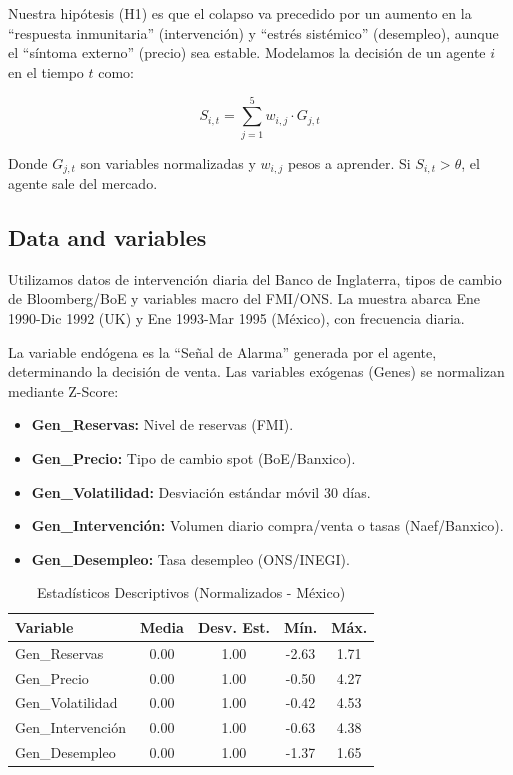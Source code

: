 Nuestra hipótesis (H1) es que el colapso va precedido por un aumento en la ``respuesta inmunitaria'' (intervención) y ``estrés sistémico'' (desempleo), aunque el ``síntoma externo'' (precio) sea estable. Modelamos la decisión de un agente $i$ en el tiempo $t$ como:

\begin{equation}
S_{i,t} = \sum_{j=1}^{5} w_{i,j} \cdot G_{j,t}
\end{equation}

Donde $G_{j,t}$ son variables normalizadas y $w_{i,j}$ pesos a aprender. Si $S_{i,t} > \theta$, el agente sale del mercado.

\subsection{Data and variables}

Utilizamos datos de intervención diaria del Banco de Inglaterra, tipos de cambio de Bloomberg/BoE y variables macro del FMI/ONS. La muestra abarca Ene 1990-Dic 1992 (UK) y Ene 1993-Mar 1995 (México), con frecuencia diaria.

La variable endógena es la ``Señal de Alarma'' generada por el agente, determinando la decisión de venta. Las variables exógenas (Genes) se normalizan mediante Z-Score:
\begin{itemize}
    \item \textbf{Gen\_Reservas:} Nivel de reservas (FMI).
    \item \textbf{Gen\_Precio:} Tipo de cambio spot (BoE/Banxico).
    \item \textbf{Gen\_Volatilidad:} Desviación estándar móvil 30 días.
    \item \textbf{Gen\_Intervención:} Volumen diario compra/venta o tasas (Naef/Banxico).
    \item \textbf{Gen\_Desempleo:} Tasa desempleo (ONS/INEGI).
\end{itemize}

\begin{table}[H]
\centering
\caption{Estadísticos Descriptivos (Normalizados - México)}
\begin{tabular}{lcccc}
\toprule
Variable & Media & Desv. Est. & Mín. & Máx. \\
\midrule
Gen\_Reservas & 0.00 & 1.00 & -2.63 & 1.71 \\
Gen\_Precio & 0.00 & 1.00 & -0.50 & 4.27 \\
Gen\_Volatilidad & 0.00 & 1.00 & -0.42 & 4.53 \\
Gen\_Intervención & 0.00 & 1.00 & -0.63 & 4.38 \\
Gen\_Desempleo & 0.00 & 1.00 & -1.37 & 1.65 \\
\bottomrule
\end{tabular}
\end{table}

